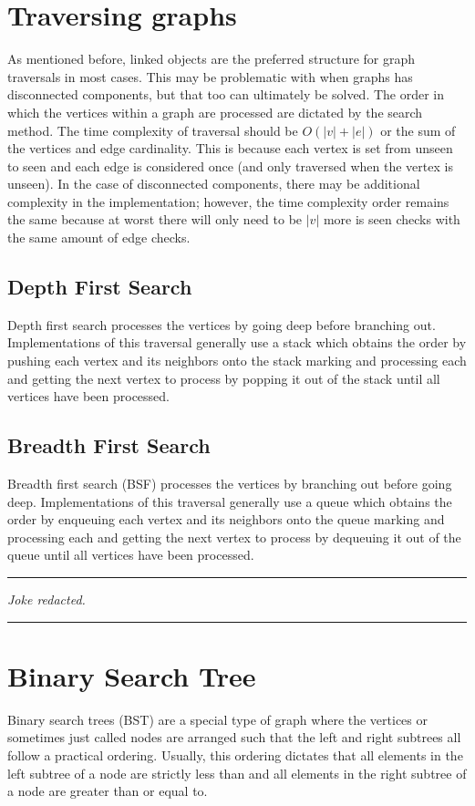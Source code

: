 \documentclass[letterpaper, 10pt]{article}
\begin{document}
\section{Traversing graphs}
As mentioned before, linked objects are the preferred structure for graph traversals in most cases. This may
be problematic with when graphs has disconnected components, but that too can ultimately be solved. The order
in which the vertices within a graph are processed are dictated by the search method. The time complexity
of traversal should be \(O(|v| + |e|)\) or the sum of the vertices and edge cardinality. This is because each
vertex is set from unseen to seen and each edge is considered once (and only traversed when the vertex is unseen).
In the case of disconnected components, there may be additional complexity in the implementation; however, the
time complexity order remains the same because at worst there will only need to be \(|v|\) more is seen checks with
the same amount of edge checks.
\subsection{Depth First Search}
Depth first search processes the vertices by going deep before branching out.
Implementations of this traversal generally use a stack which obtains the order by pushing
each vertex and its neighbors onto the stack marking and processing each and getting the next
vertex to process by popping it out of the stack until all vertices have been processed.
\subsection{Breadth First Search}
Breadth first search (BSF) processes the vertices by branching out before going deep.
Implementations of this traversal generally use a queue which obtains the order by enqueuing
each vertex and its neighbors onto the queue marking and processing each and getting the next
vertex to process by dequeuing it out of the queue until all vertices have been processed.
\vspace{.25cm}
\hrule
\vspace{.25cm}
\noindent
\textit{Joke redacted.}\\
\hrule
\vspace{1cm}

\section{Binary Search Tree}
Binary search trees (BST) are a special type of graph where the vertices or sometimes just called nodes
are arranged such that the left and right subtrees all follow a practical ordering. Usually, this ordering
dictates that all elements in the left subtree of a node are strictly less than and all elements in the right
subtree of a node are greater than or equal to.
\end{document}
